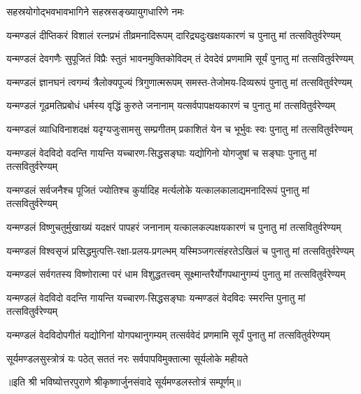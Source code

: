 {सहस्रयोगोद्भवभावभागिने सहस्रसङ्ख्यायुगधारिणे नमः}

\twolineshloka
{यन्मण्डलं दीप्तिकरं विशालं रत्नप्रभं तीव्रमनादिरूपम्}
{दारिद्र्यदुःखक्षयकारणं च पुनातु मां तत्सवितुर्वरेण्यम्}

\twolineshloka
{यन्मण्डलं देवगणैः सुपूजितं   विप्रैः स्तुतं भावनमुक्तिकोविदम्}
{तं देवदेवं प्रणमामि सूर्यं   पुनातु मां तत्सवितुर्वरेण्यम्}

\twolineshloka
{यन्मण्डलं ज्ञानघनं त्वगम्यं   त्रैलोक्यपूज्यं त्रिगुणात्मरूपम्}
{समस्त-तेजोमय-दिव्यरूपं   पुनातु मां तत्सवितुर्वरेण्यम्}

\twolineshloka
{यन्मण्डलं गूढमतिप्रबोधं   धर्मस्य वृद्धिं कुरुते जनानाम्}
{यत्सर्वपापक्षयकारणं च   पुनातु मां तत्सवितुर्वरेण्यम्}

\twolineshloka
{यन्मण्डलं व्याधिविनाशदक्षं   यदृग्यजुःसामसु सम्प्रगीतम्}
{प्रकाशितं येन च भूर्भुवः स्वः   पुनातु मां तत्सवितुर्वरेण्यम्}

\twolineshloka
{यन्मण्डलं वेदविदो वदन्ति   गायन्ति यच्चारण-सिद्धसङ्घाः}
{यद्योगिनो योगजुषां च सङ्घाः   पुनातु मां तत्सवितुर्वरेण्यम्}

\twolineshloka
{यन्मण्डलं सर्वजनैश्च पूजितं   ज्योतिश्च कुर्यादिह मर्त्यलोके}
{यत्कालकालाद्यमनादिरूपं   पुनातु मां तत्सवितुर्वरेण्यम्}

\twolineshloka
{यन्मण्डलं विष्णुचतुर्मुखाख्यं यदक्षरं पापहरं जनानाम्}
{यत्कालकल्पक्षयकारणं च   पुनातु मां तत्सवितुर्वरेण्यम्}

\twolineshloka
{यन्मण्डलं विश्वसृजं प्रसिद्धमुत्पत्ति-रक्षा-प्रलय-प्रगल्भम्}
{यस्मिञ्जगत्संहरतेऽखिलं च   पुनातु मां तत्सवितुर्वरेण्यम्}

\twolineshloka
{यन्मण्डलं सर्वगतस्य विष्णोरात्मा   परं धाम विशुद्धतत्त्वम्}
{सूक्ष्मान्तरैर्योगपथानुगम्यं   पुनातु मां तत्सवितुर्वरेण्यम्}

\twolineshloka
{यन्मण्डलं वेदविदो वदन्ति   गायन्ति यच्चारण-सिद्धसङ्घाः}
{यन्मण्डलं वेदविदः स्मरन्ति   पुनातु मां तत्सवितुर्वरेण्यम्}

\twolineshloka
{यन्मण्डलं वेदविदोपगीतं   यद्योगिनां योगपथानुगम्यम्}
{तत्सर्ववेदं प्रणमामि सूर्यं   पुनातु मां तत्सवितुर्वरेण्यम्}

\twolineshloka
{सूर्यमण्डलसुस्त्रोत्रं यः पठेत् सततं नरः}
{सर्वपापविमुक्तात्मा सूर्यलोके महीयते}

॥इति श्री भविष्योत्तरपुराणे श्रीकृष्णार्जुनसंवादे सूर्यमण्डलस्तोत्रं सम्पूर्णम्॥